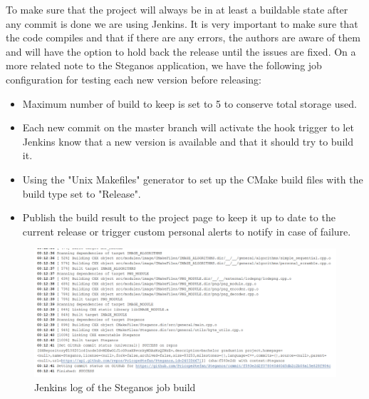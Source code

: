 \begin{multicols}{2}
To make sure that the project will always be in at least a buildable state after any commit is done we are using Jenkins. It is very important to make sure that the code compiles and that if there are any errors, the authors are aware of them and will have the option to hold back the release until the issues are fixed. On a more related note to the Steganos application, we have the following job configuration for testing each new version before releasing:
\begin{itemize}
	\item Maximum number of build to keep is set to 5 to conserve total storage used.
	\item Each new commit on the master branch will activate the hook trigger to let Jenkins know that a new version is available and that it should try to build it.
	\item Using the "Unix Makefiles" generator to set up the CMake build files with the build type set to "Release".
	\item Publish the build result to the project page to keep it up to date to the current release or trigger custom personal alerts to notify in case of failure.
\end{itemize}
\end{multicols}

\begin{figure}[H]
    \centering
    \includegraphics[width=15cm,keepaspectratio]{pics/application_chapter/jenkins_project_build}
    \caption{Jenkins log of the Steganos job build}
    \label{jenkins-log}
\end{figure}



